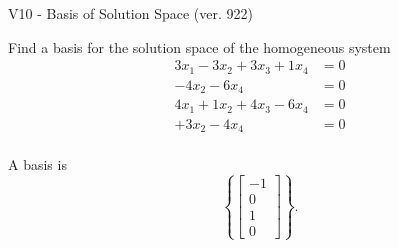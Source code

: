 \begin{exercise}
  \begin{exerciseTitle}V10 - Basis of Solution Space (ver. 922)\end{exerciseTitle}
  \begin{exerciseStatement}
    Find a basis for the solution space of the homogeneous system 
\begin{align*}
 3 x_ 1 -3 x_ 2 + 3 x_ 3 + 1 x_ 4 &= 0  \\ 
  -4 x_ 2 -6 x_ 4 &= 0  \\ 
  4 x_ 1 + 1 x_ 2 + 4 x_ 3 -6 x_ 4 &= 0  \\ 
  + 3 x_ 2 -4 x_ 4 &= 0  \\ 
 \end{align*}


 
  \end{exerciseStatement}

  \begin{exerciseAnswer}
   A basis is   
\[\left\{\left[\begin{array}{c}
-1 \\
0 \\
1 \\
0
\end{array}\right]\right\}.\]

  


  \end{exerciseAnswer}
\end{exercise}
